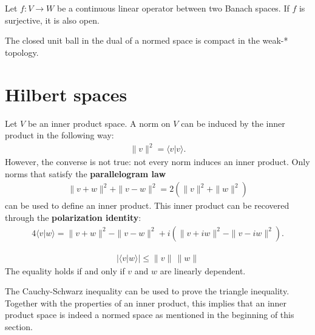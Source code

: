     \begin{theorem}
        Let $f:V\rightarrow W$ be a continuous linear operator between two Banach spaces. If $f$ is surjective, it is also open.
    \end{theorem}

    \begin{theorem}
        The closed unit ball in the dual of a normed space is compact in the weak-* topology.
    \end{theorem}

\section{Hilbert spaces}

    \begin{remark}
        Let $V$ be an inner product space. A norm on $V$ can be induced by the inner product in the following way:
        \begin{gather}
            \label{functional:inner_product_norm}
            \|v\|^2 = \langle v|v \rangle.
        \end{gather}
        However, the converse is not true: not every norm induces an inner product. Only norms that satisfy the \textbf{parallelogram law}
        \begin{gather}
            \label{functional:parallellogram_law}
            \|v+w\|^2 + \|v-w\|^2 = 2(\|v\|^2 + \|w\|^2)
        \end{gather}
        can be used to define an inner product. This inner product can be recovered through the \textbf{polarization identity}:
        \begin{gather}
            \label{functional:polarization_identity}
            4 \langle v|w \rangle = \|v+w\|^2 - \|v-w\|^2 + i\left(\|v+iw\|^2 - \|v-iw\|^2\right).
        \end{gather}
    \end{remark}

    \begin{property}\label{functional:cauchy_schwarz}
        \begin{gather}
            |\langle v|w\rangle| \leq \|v\|\,\|w\|
        \end{gather}
        The equality holds if and only if $v$ and $w$ are linearly dependent.
    \end{property}
    \begin{result}
        The Cauchy-Schwarz inequality can be used to prove the triangle inequality. Together with the properties of an inner product, this implies that an inner product space is indeed a normed space as mentioned in the beginning of this section.
    \end{result}


